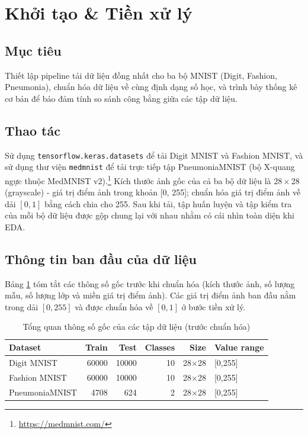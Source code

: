 \documentclass[a4paper,12pt]{report}
\begin{document}
\newpage
\tableofcontents
\newpage

\section{Khởi tạo \& Tiền xử lý}
\subsection{Mục tiêu}
Thiết lập pipeline tải dữ liệu đồng nhất cho ba bộ MNIST (Digit, Fashion, Pneumonia), chuẩn hóa dữ liệu về cùng định dạng số học, và trình bày thống kê cơ bản để bảo đảm tính so sánh công bằng giữa các tập dữ liệu.

\subsection{Thao tác}
Sử dụng \texttt{tensorflow.keras.datasets} để tải Digit MNIST và Fashion MNIST, và sử dụng thư viện \texttt{medmnist} để tải trực tiếp tập PneumoniaMNIST (bộ X-quang ngực thuộc MedMNIST v2).\footnote{\url{https://medmnist.com/}} Kích thước ảnh gốc của cả ba bộ dữ liệu là 28\,$\times$\,28 (grayscale) - giá trị điểm ảnh trong khoản [0, 255]; chuẩn hóa giá trị điểm ảnh về dải $[0,1]$ bằng cách chia cho 255. Sau khi tải, tập huấn luyện và tập kiểm tra của mỗi bộ dữ liệu được gộp chung lại với nhau nhằm có cái nhìn toàn diện khi EDA.

\subsection{Thông tin ban đầu của dữ liệu}
Bảng \ref{tab:raw-dataset-summary} tóm tắt các thông số gốc trước khi chuẩn hóa (kích thước ảnh, số lượng mẫu, số lượng lớp và miền giá trị điểm ảnh). Các giá trị điểm ảnh ban đầu nằm trong dải $[0,255]$ và được chuẩn hóa về $[0,1]$ ở bước tiền xử lý.

\begin{table}[H]
    \centering
    \caption{Tổng quan thông số gốc của các tập dữ liệu (trước chuẩn hóa)}
    \label{tab:raw-dataset-summary}
    \begin{tabular}{lrrrrl}
        \toprule
        \textbf{Dataset} & \textbf{Train} & \textbf{Test} & \textbf{Classes} & \textbf{Size} & \textbf{Value range} \\
        \midrule
        Digit MNIST & 60000 & 10000 & 10 & 28$\times$28 & [0,255] \\
        Fashion MNIST & 60000 & 10000 & 10 & 28$\times$28 & [0,255] \\
        PneumoniaMNIST & 4708 & 624 & 2 & 28$\times$28 & [0,255] \\
        \bottomrule
    \end{tabular}
\end{table}
\end{document}
